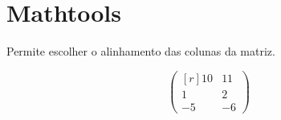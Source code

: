 \documentclass{article}
\begin{document}

\section{Mathtools}

Permite escolher o alinhamento das colunas da matriz.

\[
\begin{pmatrix*}[r]
	10&11\\
	1&2\\
	-5&-6
\end{pmatrix*}
\]
\end{document}
